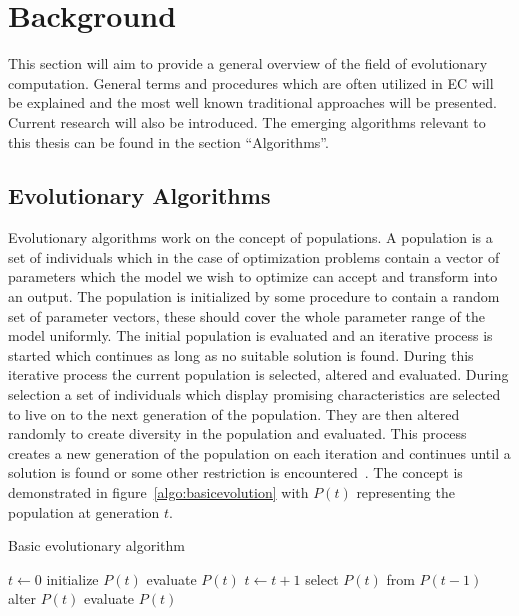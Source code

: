 \section{Background}

This section will aim to provide a general overview of the field of evolutionary computation. General terms and procedures which are often utilized in EC will be explained and the most well known traditional approaches will be presented. Current research will also be introduced. The emerging algorithms relevant to this thesis can be found in the section ``Algorithms''.

\subsection{Evolutionary Algorithms}

Evolutionary algorithms work on the concept of populations. A population is a set of individuals which in the case of optimization problems contain a vector of parameters which the model we wish to optimize can accept and transform into an output. The population is initialized by some procedure to contain a random set of parameter vectors, these should cover the whole parameter range of the model uniformly. The initial population is evaluated and an iterative process is started which continues as long as no suitable solution is found. During this iterative process the current population is selected, altered and evaluated. During selection a set of individuals which display promising characteristics are selected to live on to the next generation of the population. They are then altered randomly to create diversity in the population and evaluated. This process creates a new generation of the population on each iteration and continues until a solution is found or some other restriction is encountered~\cite{Eiben20021}. The concept is demonstrated in figure~\ref{algo:basicevolution} with $P(t)$ representing the population at generation $t$.

\begin{algorithm}[h]

  \caption{Basic evolutionary algorithm}
  \label{algo:basicevolution}
    \begin{algorithmic}
       \State $t\gets 0$
       \State initialize $P(t)$
       \State evaluate $P(t)$
        \State $t\gets t + 1$
        \State select $P(t)$ from $P(t-1)$
        \State alter $P(t)$
        \State evaluate $P(t)$
       \EndWhile
    \end{algorithmic}

\end{algorithm}

